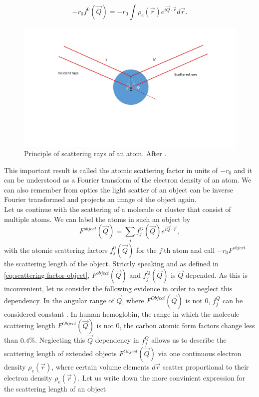 \begin{equation}
-r_{0} f^{0}\left(\vec{Q}\right)=-r_{0}\int\rho_{e}\left(\vec{r}\right)e^{i \vec{Q}\cdot \vec{r}}d\vec{r}.
\label{eq:scattering-integral}
\end{equation}
\begin{figure}
	\centering
		\includegraphics[width=1.00\textwidth]{images/X-ray-scattering.jpg}
	\caption[Principle of scattering rays of an atom.]{Principle of scattering rays of an atom. After \cite{Als-Nielson-2011-JWS,Guinier-1955-JWS}.}
	\label{fig:X-ray-scattering}
\end{figure}
This important result is called the atomic scattering factor in units of $-r_{0}$ and it can be understood as a Fourier transform of the electron density of an atom. We can also remember from optics the light scatter of an object can be inverse Fourier transformed and projects an image of the object again.\\
Let us continue with the scattering of a molecule or cluster that consist of multiple atoms. We can label the atoms in such an object by
\begin{equation}
F^{object}\left(\vec{Q}\right)=\sum_{j}f_{j}^{O}\left(\vec{Q}\right)e^{i \vec{Q}\cdot \vec{r}},
\label{eq:scattering-factor-object}
\end{equation}
with the atomic scattering factors $f_{j}^{0}\left(\vec{Q}\right)$ for the $j$'th atom and call $-r_{0} F^{object}$ the scattering length of the object. Strictly speaking and as defined in \eqref{eq:scattering-factor-object}, $F^{object}\left(\vec{Q}\right)$ and $f_{j}^{Q}\left(\vec{Q}\right)$ is $\vec{Q}$ depended. As this is inconvenient, let us consider the following evidence in order to neglect this dependency. In the angular range of $\vec{Q}$, where $F^{Object}\left(\vec{Q}\right)$ is not 0, $f_{j}^{Q}$ can be considered constant \citep[see][p. 6-7]{Guinier-1955-JWS}. In human hemoglobin, the range in which the molecule scattering length $F^{Object}\left(\vec{Q}\right)$ is not 0, the carbon atomic form factors change less than $0.4$\%. Neglecting this $\vec{Q}$ dependency in $f_{j}^{Q}$ allows us to describe the scattering length of extended objects $F^{Object}\left(\vec{Q}\right)$ via one continuous electron density $\rho_{e}\left(\vec{r}\right)$, where certain volume elements $d\vec{r}$ scatter proportional to their electron density $\rho_{e}\left(\vec{r}\right)$. Let us write down the more convinient expression for the scattering length of an object
